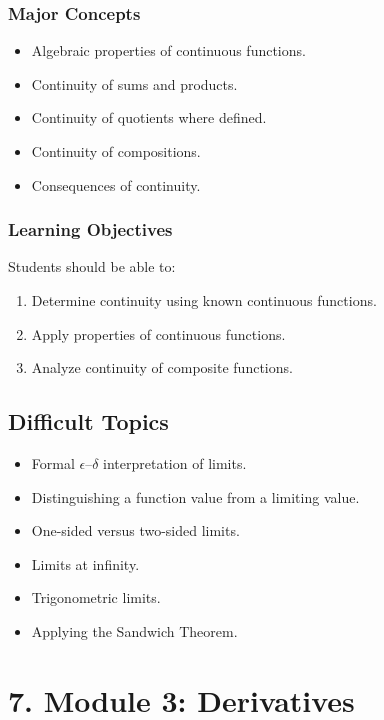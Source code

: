 \documentclass[11pt]{article}
\begin{document}
\subsubsection{Major Concepts}

\begin{itemize}
    \item Algebraic properties of continuous functions.
    \item Continuity of sums and products.
    \item Continuity of quotients where defined.
    \item Continuity of compositions.
    \item Consequences of continuity.
\end{itemize}

\subsubsection{Learning Objectives}

Students should be able to:

\begin{enumerate}
    \item Determine continuity using known continuous functions.
    \item Apply properties of continuous functions.
    \item Analyze continuity of composite functions.
\end{enumerate}

\subsection{Difficult Topics}

\begin{itemize}
    \item Formal $\epsilon$--$\delta$ interpretation of limits.
    \item Distinguishing a function value from a limiting value.
    \item One-sided versus two-sided limits.
    \item Limits at infinity.
    \item Trigonometric limits.
    \item Applying the Sandwich Theorem.
\end{itemize}

\section{7. Module 3: Derivatives}
\end{document}

